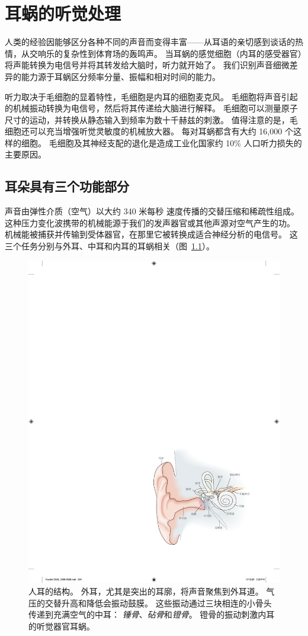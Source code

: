 \chapter{耳蜗的听觉处理} \label{chap:chap26}

人类的经验因能够区分各种不同的声音而变得丰富——从耳语的亲切感到谈话的热情，从交响乐的复杂性到体育场的轰鸣声。
当耳蜗的感觉细胞（内耳的感受器官）将声能转换为电信号并将其转发给大脑时，听力就开始了。
我们识别声音细微差异的能力源于耳蜗区分频率分量、振幅和相对时间的能力。


听力取决于毛细胞的显着特性，毛细胞是内耳的细胞麦克风。
毛细胞将声音引起的机械振动转换为电信号，然后将其传递给大脑进行解释。
毛细胞可以测量原子尺寸的运动，并转换从静态输入到频率为数十千赫兹的刺激。
值得注意的是，毛细胞还可以充当增强听觉灵敏度的机械放大器。
每对耳蜗都含有大约 16,000 个这样的细胞。
毛细胞及其神经支配的退化是造成工业化国家约 10\% 人口听力损失的主要原因。



\section{耳朵具有三个功能部分}

声音由弹性介质（空气）以大约 340 米每秒 速度传播的交替压缩和稀疏性组成。
这种压力变化波携带的机械能源于我们的发声器官或其他声源对空气产生的功。
机械能被捕获并传输到受体器官，在那里它被转换成适合神经分析的电信号。
这三个任务分别与外耳、中耳和内耳的耳蜗相关（图~\ref{fig:26_1}）。


\begin{figure}[htbp]
	\centering
	\includegraphics[width=0.6\linewidth]{chap26/fig_26_1}
	\caption{人耳的结构。 
		外耳，尤其是突出的耳廓，将声音聚焦到外耳道。
		气压的交替升高和降低会振动鼓膜。
		这些振动通过三块相连的小骨头传递到充满空气的中耳：
		\textit{锤骨}、\textit{砧骨}和\textit{镫骨}。 
		镫骨的振动刺激内耳的听觉器官耳蜗。}
	\label{fig:26_1}
\end{figure}


